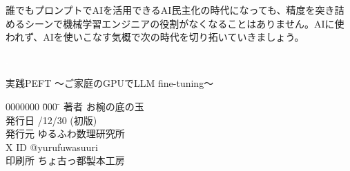 \documentclass[a5paper,twoside,dvipdfmx]{jsarticle}
\begin{document}
誰でもプロンプトでAIを活用できるAI民主化の時代になっても、精度を突き詰めるシーンで機械学習エンジニアの役割がなくなることはありません。AIに使われず、AIを使いこなす気概で次の時代を切り拓いていきましょう。

\newpage

\thispagestyle{empty} 

\textcolor{white}{.}
\vspace{\baselineskip}
\vspace{\baselineskip}
\vspace{\baselineskip}
\vspace{\baselineskip}
\vspace{\baselineskip}
\vspace{\baselineskip}
\vspace{\baselineskip}
\vspace{\baselineskip}
\vspace{\baselineskip}
\vspace{\baselineskip}
\vspace{\baselineskip}
\vspace{\baselineskip}
\vspace{\baselineskip}
\vspace{\baselineskip}
\vspace{\baselineskip}
\vspace{\baselineskip}
\vspace{\baselineskip}
\begin{screen}

実践PEFT ～ご家庭のGPUでLLM fine-tuning～

\begin{tabbing}
  0000000 \= 000 \= \kill
  著者 \> お椀の底の玉 \\
  発行日 /12/30 (初版) \\
  発行元 \> ゆるふわ数理研究所　\\
  X ID \> @yurufuwasuuri \\
  印刷所 \> ちょ古っ都製本工房
\end{tabbing}

\end{screen}

\vspace{\baselineskip}



\end{document}

